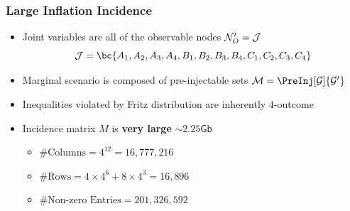 \documentclass[
    hyperref={bookmarks=false},%
    xcolor={dvipsnames},
]{beamer}
\begin{document}

\begin{frame}
    \frametitle{Large Inflation Incidence}
    \begin{itemize}
        \item Joint variables are all of the observable nodes $\mathcal{N}_O' = \mathcal{J}$
        \[ \jointvar = \bc{A_1, A_2, A_3, A_4,B_1, B_2, B_3, B_4,C_1, C_2, C_3, C_4} \]
        \item Marginal scenario is composed of pre-injectable sets $\mscenario = \PreInj[\graph]{\graph'}$
        \item Inequalities violated by Fritz distribution are inherently $4$-outcome
        \item Incidence matrix $M$ is \textbf{very large} $\sim 2.25 \textsf{Gb}$
        \begin{itemize}
            \item $\# \text{Columns} = 4^{12} = 16,777,216$
            \item $\# \text{Rows} =  4\times 4^{6} + 8 \times 4^{3} = 16,896$
            \item $\# \text{Non-zero Entries} = 201,326,592$
        \end{itemize}
    \end{itemize}
\end{frame}
\end{document}
